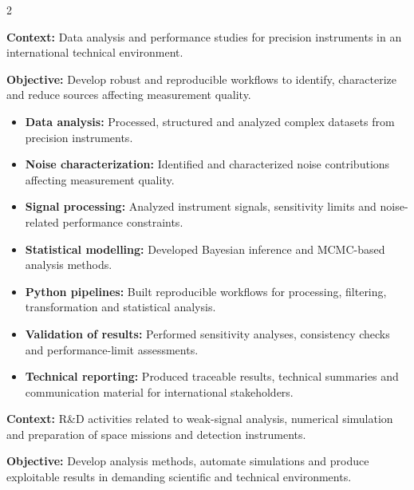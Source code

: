 \documentclass[8pt,a4paper,ragged2e,withhyper]{altacv}
\begin{document}
\begin{paracol}{2}
\divider


\textbf{Context:} Data analysis and performance studies for precision instruments in an international technical environment.

\textbf{Objective:} Develop robust and reproducible workflows to identify, characterize and reduce sources affecting measurement quality.

\begin{itemize}
  \item \textbf{Data analysis:} Processed, structured and analyzed complex datasets from precision instruments.
  \item \textbf{Noise characterization:} Identified and characterized noise contributions affecting measurement quality.
  \item \textbf{Signal processing:} Analyzed instrument signals, sensitivity limits and noise-related performance constraints.
  \item \textbf{Statistical modelling:} Developed Bayesian inference and MCMC-based analysis methods.
  \item \textbf{Python pipelines:} Built reproducible workflows for processing, filtering, transformation and statistical analysis.
  \item \textbf{Validation of results:} Performed sensitivity analyses, consistency checks and performance-limit assessments.
  \item \textbf{Technical reporting:} Produced traceable results, technical summaries and communication material for international stakeholders.
\end{itemize}

\divider


\textbf{Context:} R\&D activities related to weak-signal analysis, numerical simulation and preparation of space missions and detection instruments.

\textbf{Objective:} Develop analysis methods, automate simulations and produce exploitable results in demanding scientific and technical environments.


\end{paracol}
\end{document}
